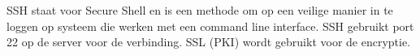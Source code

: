 SSH staat voor Secure Shell en is een methode om op een veilige manier in te loggen op systeem die werken met een command line interface. SSH gebruikt port 22 op de server voor de verbinding. SSL (PKI) wordt gebruikt voor de encryptie.

